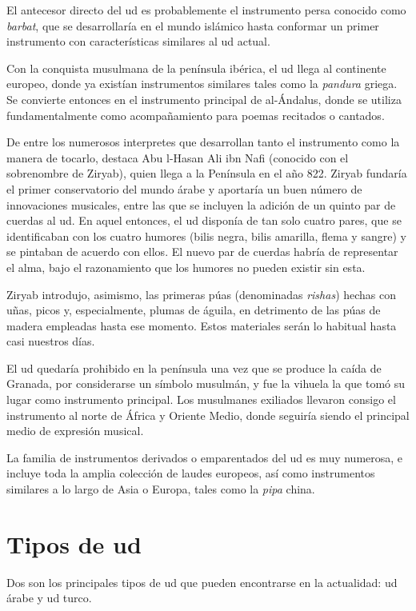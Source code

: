 El antecesor directo del ud es probablemente el instrumento persa conocido como \emph{barbat}, que se desarrollaría en el mundo islámico hasta conformar un primer instrumento con características similares al ud actual.

Con la conquista musulmana de la península ibérica, el ud llega al continente europeo, donde ya existían instrumentos similares tales como la \emph{pandura} griega. Se convierte entonces en el instrumento principal de al-Ándalus, donde se utiliza fundamentalmente como acompañamiento para poemas recitados o cantados.

De entre los numerosos interpretes que desarrollan tanto el instrumento como la manera de tocarlo, destaca Abu l-Hasan Ali ibn Nafi (conocido con el sobrenombre de Ziryab), quien llega a la Península en el año 822. Ziryab fundaría el primer conservatorio del mundo árabe y aportaría un buen número de innovaciones musicales, entre las que se incluyen la adición de un quinto par de cuerdas al ud. En aquel entonces, el ud disponía de tan solo cuatro pares, que se identificaban con los cuatro humores (bilis negra, bilis amarilla, flema y sangre) y se pintaban de acuerdo con ellos. El nuevo par de cuerdas habría de representar el alma, bajo el razonamiento que los humores no pueden existir sin esta.

Ziryab introdujo, asimismo, las primeras púas (denominadas \emph{rishas}) hechas con uñas, picos y, especialmente, plumas de águila, en detrimento de las púas de madera empleadas hasta ese momento. Estos materiales serán lo habitual hasta casi nuestros días.

El ud quedaría prohibido en la península una vez que se produce la caída de Granada, por considerarse un símbolo musulmán, y fue la vihuela la que tomó su lugar como instrumento principal. Los musulmanes exiliados llevaron consigo el instrumento al norte de África y Oriente Medio, donde seguiría siendo el principal medio de expresión musical.

La familia de instrumentos derivados o emparentados del ud es muy numerosa, e incluye toda la amplia colección de laudes europeos, así como instrumentos similares a lo largo de Asia o Europa, tales como la \emph{pipa} china.

\section{Tipos de ud}

Dos son los principales tipos de ud que pueden encontrarse en la actualidad: ud árabe y ud turco.

